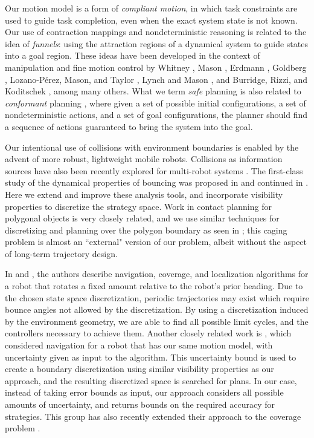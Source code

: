 \documentclass[sageh,times,Review]{sagej}
\begin{document}
Our motion model is a
form of \emph{compliant motion}, in which task constraints are used to guide task
completion, even when the exact system state is not known. Our use of
contraction mappings and nondeterministic reasoning is
related to the idea of \emph{funnels}: using
the attraction regions of a dynamical system to guide states into a goal region.
These ideas have been developed in the context of manipulation and fine motion control by Whitney
\cite{Whi77}, Mason \cite{Mas85}, Erdmann
\cite{Erd86}, Goldberg \cite{Gol93}, Lozano-P{\'e}rez, Mason, and Taylor
\cite{LozMasTay84}, Lynch and Mason \cite{LynMas95}, and Burridge, Rizzi, and Koditschek
\cite{BurRizKod99}, among many others. What we term {\em safe} planning is also
related to {\em conformant} planning \cite{anders2018reliably}, where given a set of possible initial configurations, a set of
nondeterministic actions, and a set of goal configurations, the planner should
find a sequence of actions guaranteed to bring the system into the goal. 


Our intentional use of collisions with
environment boundaries is enabled by the advent of more robust, lightweight mobile
robots. Collisions as information sources have also been
recently explored for multi-robot systems \cite{mayya2018localization}.
The first-class study of the dynamical properties of bouncing was proposed in
\cite{ErLav13} and continued in \cite{NilBecLav17}. Here we extend and improve
these analysis tools, and incorporate visibility properties to
discretize the strategy space. Work in contact planning for polygonal objects is
very closely related, and we use similar techniques for discretizing and
planning over the polygon boundary as seen in \cite{allen2015two}; this caging
problem is almost an ``external" version of our problem, albeit without the
aspect of long-term trajectory design.

In \cite{alam2017minimalist} and \cite{alam2018space}, the authors describe
navigation, coverage, and localization algorithms for a robot that rotates a fixed amount 
relative to the robot's prior heading. Due to the chosen state space discretization, 
periodic trajectories may exist which require bounce angles not allowed by the
discretization. By using a discretization induced by the environment geometry,
we are able to find all possible limit cycles, and the controllers necessary to
achieve them.
Another closely related work is \cite{LewOKa13}, which considered
navigation for a robot that has our same motion model, with uncertainty given as input to the
algorithm. This uncertainty bound is used to create a boundary discretization
using similar visibility properties as our approach, and the resulting
discretized space is searched for plans. In our case, instead of taking error bounds as input, our approach
considers all possible amounts of uncertainty, and returns bounds on the required
accuracy for strategies. This group has also recently extended their approach to
the coverage problem \cite{lewis2018guaranteed}.
\end{document}

